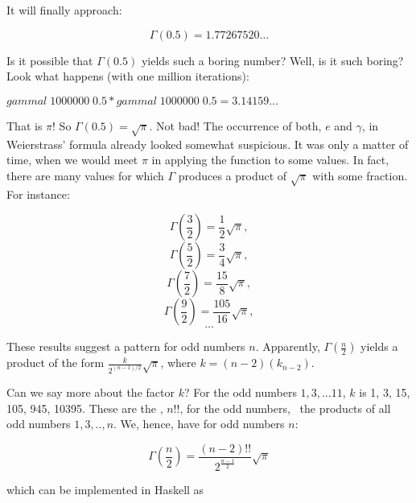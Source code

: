 \documentclass[tikz]{scrreprt}
\newcommand{\Varid}[1]{\mathit{#1}}
\begin{document}
It will finally approach: 

\[
\Gamma(0.5) = 1.77267520\dots
\]

Is it possible that $\Gamma(0.5)$ yields such a boring number?
Well, is it such boring? Look what happens (with one million iterations):

\ensuremath{\Varid{gammal}\;\mathrm{1000000}\;\mathrm{0.5}\mathbin{*}\Varid{gammal}\;\mathrm{1000000}\;\mathrm{0.5}\mathrel{=}\mathrm{3.14159}\mathbin{...}}

That is $\pi$! So $\Gamma(0.5) = \sqrt{\pi}$. Not bad!
The occurrence of both, $e$ and $\gamma$, in Weierstrass' formula
already looked somewhat suspicious. It was only a matter of time,
when we would meet $\pi$ in applying the function to some values.
In fact, there are many values for which $\Gamma$ produces
a product of $\sqrt{\pi}$ with some fraction. For instance:

\[
\Gamma\left(\frac{3}{2}\right) = \frac{1}{2}\sqrt{\pi},
\]
\[
\Gamma\left(\frac{5}{2}\right) = \frac{3}{4}\sqrt{\pi},
\]
\[
\Gamma\left(\frac{7}{2}\right) = \frac{15}{8}\sqrt{\pi},
\]
\[
\Gamma\left(\frac{9}{2}\right) = \frac{105}{16}\sqrt{\pi},
\]
\[
\dots
\]

These results suggest a pattern for odd numbers $n$.
Apparently, $\Gamma(\frac{n}{2})$ yields a product of the form
$\frac{k}{2^{(n-1)/2}}\sqrt{\pi}$,
where $k = (n-2)(k_{n-2})$.

Can we say more about the factor $k$?
For the odd numbers $1,3,\dots 11$, $k$ is
1, 3, 15, 105, 945, 10395.
These are the , $n!!$, 
for the odd numbers, \ie\
the products of all odd numbers $1,3,..,n$.
We, hence, have for odd numbers $n$:

\begin{equation}
\Gamma\left(\frac{n}{2}\right) = \frac{(n-2)!!}{2^{\frac{n-1}{2}}}\sqrt{\pi}
\end{equation}

which can be implemented in Haskell as
\end{document}
